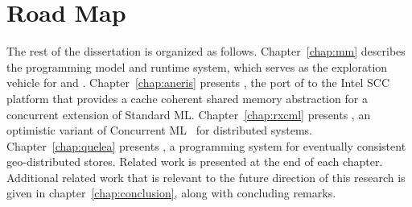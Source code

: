 \section{Road Map}

The rest of the dissertation is organized as follows. Chapter~\ref{chap:mm}
describes the \MM programming model and runtime system, which serves as the
exploration vehicle for \MMSCC and \rxcml. Chapter~\ref{chap:aneris} presents
\MMSCC, the port of \MM to the Intel SCC platform that provides a cache
coherent shared memory abstraction for a concurrent extension of Standard ML.
Chapter~\ref{chap:rxcml} presents \rxcml, an optimistic variant of Concurrent
ML~\cite{Reppy99} for distributed systems. Chapter~\ref{chap:quelea} presents
\quelea, a programming system for eventually consistent geo-distributed stores.
Related work is presented at the end of each chapter. Additional related work
that is relevant to the future direction of this research is given in
chapter~\ref{chap:conclusion}, along with concluding remarks.
